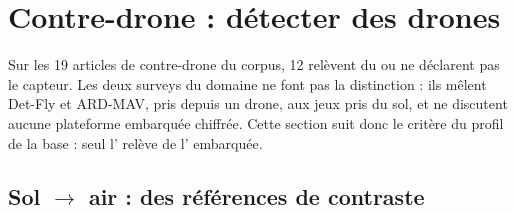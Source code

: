 \section{Contre-drone : détecter des drones}
\label{sec:contre-drone}

Sur les 19 articles de contre-drone du corpus, 12 relèvent du  ou
ne déclarent pas le capteur. Les deux surveys du domaine
\citep{arxiv-2504.11967-securing-skies-comprehensive-survey-anti,arxiv-2507.10006-vision-anti-unmanned-aerial-technology}\pp{}
ne font pas la distinction : ils mêlent Det-Fly et ARD-MAV, pris depuis un drone, aux jeux
pris du sol, et ne discutent aucune plateforme embarquée chiffrée. Cette section suit donc
le critère du profil de la base : seul l' relève de l' embarquée.

\subsection{Sol $\rightarrow$ air : des références de contraste}

